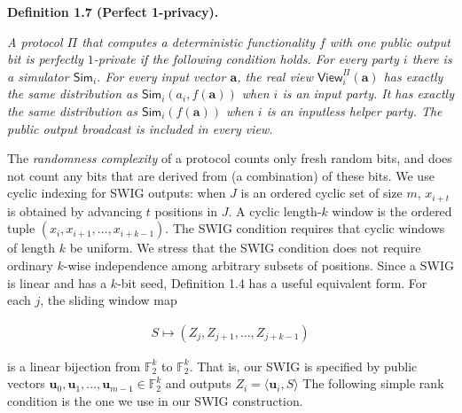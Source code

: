 

\par\medskip\noindent\textbf{
\textbf{Definition 1.7}\textbf{ }(Perfect 1-privacy)\textbf{.}
}\par



\emph{A protocol $\Pi$ that computes a deterministic functionality $f$ with one public output bit is perfectly $1$-private if the following condition holds. For every party $i$ there is a simulator $\mathsf{Sim}_{i}$. For every input vector $\mathbf{a}$, the real view $\mathsf{View}_{i}^{\Pi}(\mathbf{a})$ has exactly the same distribution as $\mathsf{Sim}_{i}(a_{i},f(\mathbf{a}))$ when $i$ is an input party. It has exactly the same distribution as $\mathsf{Sim}_{i}(f(\mathbf{a}))$ when $i$ is an inputless helper party. The public output broadcast is included in every view.}\par






The \emph{randomness complexity} of a protocol counts only fresh random bits, and does not count any bits that are derived from (a combination) of these bits.
We use cyclic indexing for SWIG outputs: when $J$ is an ordered cyclic set of size $m$, $x_{i+t}$ is obtained by advancing $t$ positions in $J$. A cyclic length-$k$ window is the ordered tuple $(x_{i},x_{i+1},\ldots,x_{i+k-1})$. The SWIG condition requires that cyclic windows of length $k$ be uniform. We stress that the SWIG condition does not require ordinary $k$-wise independence among arbitrary subsets of positions.
Since a SWIG is linear and has a $k$-bit seed, Definition 1.4 has a useful equivalent form. For each $j$, the sliding window map\par


\[\begin{gathered}
S\mapsto(Z_{j},Z_{j+1},\ldots,Z_{j+k-1})
\end{gathered}\]


is a linear bijection from $\mathbb{F}_{2}^{k}$ to $\mathbb{F}_{2}^{k}$.
That is, our SWIG is specified by public vectors $\mathbf{u}_{0},\mathbf{u}_{1},\ldots,\mathbf{u}_{m-1}\in\mathbb{F}_{2}^{k}$ and outputs
$Z_{i}=\langle\mathbf{u}_{i},S\rangle$
The following simple rank condition is the one we use in our SWIG construction.\par




